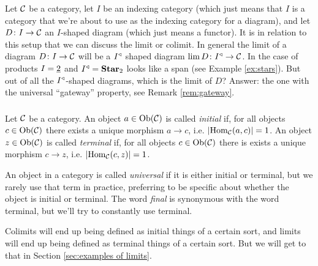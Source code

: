 \documentclass[CT4S-EN-RU]{subfiles}
\begin{document}
\begin{blockENG}
Let $\mathcal{C}$ be a category, let $I$ be an indexing category (which just means that $I$ is a category that we're about to use as the indexing category for a diagram), and let $D\colon I\rightarrow\mathcal{C}$ an $I$-shaped diagram (which just means a functor). It is in relation to this setup that we can discuss the limit or colimit. In general the limit of a diagram $D\colon I\rightarrow\mathcal{C}$ will be a $I^\triangleleft$ shaped diagram $\lim D\colon I^\triangleleft\rightarrow\mathcal{C}$. In the case of products $I=\underline{2}$ and $I^\triangleleft={\bf Star}_2$ looks like a span (see Example \ref{ex:stars}). But out of all the $I^\triangleleft$-shaped diagrams, which is the limit of $D$? Answer: the one with the universal “gateway” property, see Remark \ref{rem:gateway}.
\end{blockENG}

\begin{blockRUS}
\end{blockRUS}


\subsubsection{}

\begin{definition}
Let $\mathcal{C}$ be a category. An object $a\in\textnormal{Ob}(\mathcal{C})$ is called {\em initial} if, for all objects $c\in\textnormal{Ob}(\mathcal{C})$ there exists a unique morphism $a\to c$, i.e. $|\textnormal{Hom}_\mathcal{C}(a,c)|=1$. An object $z\in\textnormal{Ob}(\mathcal{C})$ is called {\em terminal} if, for all objects $c\in\textnormal{Ob}(\mathcal{C})$ there is exists a unique morphism $c\to z$, i.e. $|\textnormal{Hom}_\mathcal{C}(c,z)|=1$. 
\end{definition}

\begin{blockENG}
An object in a category is called {\em universal} if it is either initial or terminal, but we rarely use that term in practice, preferring to be specific about whether the object is initial or terminal. The word {\em final} is synonymous with the word terminal, but we'll try to constantly use terminal. 
\end{blockENG}

\begin{blockRUS}
\end{blockRUS}

\begin{blockENG}
Colimits will end up being defined as initial things of a certain sort, and limits will end up being defined as terminal things of a certain sort. But we will get to that in Section \ref{sec:examples of limits}.
\end{blockENG}
\end{document}
